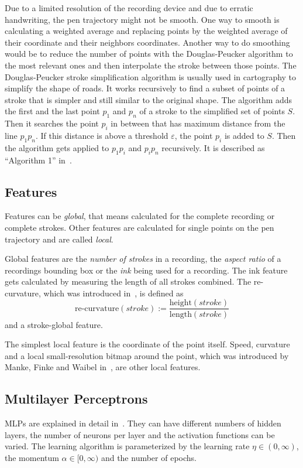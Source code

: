 \documentclass[9pt,technote]{IEEEtran}
\begin{document}
Due to a limited resolution of the recording device and due to erratic
handwriting, the pen trajectory might not be smooth. One way to smooth is
calculating a weighted average and replacing points by the weighted average of
their coordinate and their neighbors coordinates. Another way to do smoothing
would be to reduce the number of points with the Douglas-Peucker algorithm to
the most relevant ones and then interpolate the stroke between those points.
The Douglas-Peucker stroke simplification algorithm is usually used in
cartography to simplify the shape of roads. It works recursively to find a
subset of points of a stroke that is simpler and still similar to the original
shape. The algorithm adds the first and the last point $p_1$ and $p_n$ of a
stroke to the simplified set of points $S$. Then it searches the point $p_i$ in
between that has maximum distance from the line $p_1 p_n$. If this
distance is above a threshold $\varepsilon$, the point $p_i$ is added to $S$.
Then the algorithm gets applied to $p_1 p_i$ and $p_i p_n$ recursively. It is
described as \enquote{Algorithm 1} in~\cite{Visvalingam1990}.

\subsection{Features}\label{sec:features}
Features can be \textit{global}, that means calculated for the complete
recording or complete strokes. Other features are calculated for single points
on the pen trajectory and are called \textit{local}.

Global features are the \textit{number of strokes} in a recording, the
\textit{aspect ratio} of a recordings bounding box or the
\textit{ink} being used for a recording. The ink feature gets calculated by
measuring the length of all strokes combined. The re-curvature, which was
introduced in~\cite{Huang06}, is defined as
\[\text{re-curvature}(stroke) := \frac{\text{height}(stroke)}{\text{length}(stroke)}\]
and a stroke-global feature.

The simplest local feature is the coordinate of the point itself. Speed,
curvature and a local small-resolution bitmap around the point, which was
introduced by Manke, Finke and Waibel in~\cite{Manke94}, are other local
features.

\subsection{Multilayer Perceptrons}\label{sec:mlp-training}
\Glspl{MLP} are explained in detail in~\cite{Mitchell97}. They can have
different numbers of hidden layers, the number of neurons per layer and the
activation functions can be varied. The learning algorithm is parameterized by
the learning rate $\eta \in (0, \infty)$, the momentum $\alpha \in [0, \infty)$
and the number of epochs.
\end{document}
